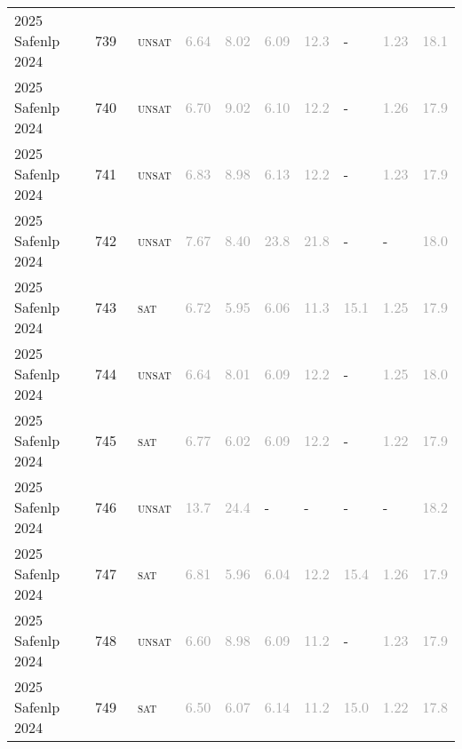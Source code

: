 \begin{center}
{\begin{longtable}{@{}llllllllll@{}}
2025 Safenlp 2024 & 739 & ~\textsc{unsat} & \textcolor{darkgray}{6.64} & \textcolor{darkgray}{8.02} & \textcolor{darkgray}{6.09} & \textcolor{darkgray}{12.3} & - & \textcolor{darkgray}{1.23} & \textcolor{darkgray}{18.1} \\
2025 Safenlp 2024 & 740 & ~\textsc{unsat} & \textcolor{darkgray}{6.70} & \textcolor{darkgray}{9.02} & \textcolor{darkgray}{6.10} & \textcolor{darkgray}{12.2} & - & \textcolor{darkgray}{1.26} & \textcolor{darkgray}{17.9} \\
2025 Safenlp 2024 & 741 & ~\textsc{unsat} & \textcolor{darkgray}{6.83} & \textcolor{darkgray}{8.98} & \textcolor{darkgray}{6.13} & \textcolor{darkgray}{12.2} & - & \textcolor{darkgray}{1.23} & \textcolor{darkgray}{17.9} \\
2025 Safenlp 2024 & 742 & ~\textsc{unsat} & \textcolor{darkgray}{7.67} & \textcolor{darkgray}{8.40} & \textcolor{darkgray}{23.8} & \textcolor{darkgray}{21.8} & - & - & \textcolor{darkgray}{18.0} \\
2025 Safenlp 2024 & 743 & ~\textsc{sat} & \textcolor{darkgray}{6.72} & \textcolor{darkgray}{5.95} & \textcolor{darkgray}{6.06} & \textcolor{darkgray}{11.3} & \textcolor{darkgray}{15.1} & \textcolor{darkgray}{1.25} & \textcolor{darkgray}{17.9} \\
2025 Safenlp 2024 & 744 & ~\textsc{unsat} & \textcolor{darkgray}{6.64} & \textcolor{darkgray}{8.01} & \textcolor{darkgray}{6.09} & \textcolor{darkgray}{12.2} & - & \textcolor{darkgray}{1.25} & \textcolor{darkgray}{18.0} \\
2025 Safenlp 2024 & 745 & ~\textsc{sat} & \textcolor{darkgray}{6.77} & \textcolor{darkgray}{6.02} & \textcolor{darkgray}{6.09} & \textcolor{darkgray}{12.2} & - & \textcolor{darkgray}{1.22} & \textcolor{darkgray}{17.9} \\
2025 Safenlp 2024 & 746 & ~\textsc{unsat} & \textcolor{darkgray}{13.7} & \textcolor{darkgray}{24.4} & - & - & - & - & \textcolor{darkgray}{18.2} \\
2025 Safenlp 2024 & 747 & ~\textsc{sat} & \textcolor{darkgray}{6.81} & \textcolor{darkgray}{5.96} & \textcolor{darkgray}{6.04} & \textcolor{darkgray}{12.2} & \textcolor{darkgray}{15.4} & \textcolor{darkgray}{1.26} & \textcolor{darkgray}{17.9} \\
2025 Safenlp 2024 & 748 & ~\textsc{unsat} & \textcolor{darkgray}{6.60} & \textcolor{darkgray}{8.98} & \textcolor{darkgray}{6.09} & \textcolor{darkgray}{11.2} & - & \textcolor{darkgray}{1.23} & \textcolor{darkgray}{17.9} \\
2025 Safenlp 2024 & 749 & ~\textsc{sat} & \textcolor{darkgray}{6.50} & \textcolor{darkgray}{6.07} & \textcolor{darkgray}{6.14} & \textcolor{darkgray}{11.2} & \textcolor{darkgray}{15.0} & \textcolor{darkgray}{1.22} & \textcolor{darkgray}{17.8} \\

\end{longtable}}
\end{center}
